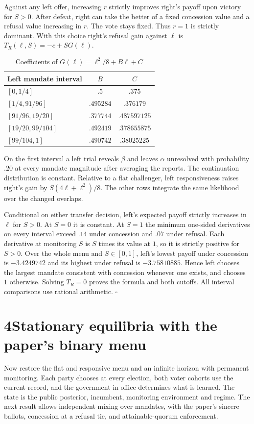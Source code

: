 \documentclass[11pt,letterpaper]{article}
\begin{document}
Against any left offer, increasing $r$ strictly improves right's payoff upon victory for $S>0$. After defeat, right can take the better of a fixed concession value and a refusal value increasing in $r$. The vote stays fixed. Thus $r=1$ is strictly dominant. With this choice right's refusal gain against $\ell$ is $T_R(\ell,S)=-c+SG(\ell)$.

\begin{table}[h]\centering\small
\caption{Coefficients of $G(\ell)=\ell^2/8+B\ell+C$}\label{tab:g}
\begin{tabular}{@{}lcc@{}}
\toprule
Left mandate interval & $B$ & $C$\\ \midrule
$[0,1/4]$ & $.5$ & $.375$\\
$[1/4,91/96]$ & $.495284$ & $.376179$\\
$[91/96,19/20]$ & $.377744$ & $.487597125$\\
$[19/20,99/104]$ & $.492419$ & $.378655875$\\
$[99/104,1]$ & $.490742$ & $.38025225$\\ \bottomrule
\end{tabular}
\end{table}
On the first interval a left trial reveals $\beta$ and leaves $\alpha$ unresolved with probability $.20$ at every mandate magnitude after averaging the reports. The continuation distribution is constant. Relative to a flat challenger, left responsiveness raises right's gain by $S(4\ell+\ell^2)/8$. The other rows integrate the same likelihood over the changed overlaps.

Conditional on either transfer decision, left's expected payoff strictly increases in $\ell$ for $S>0$. At $S=0$ it is constant. At $S=1$ the minimum one-sided derivatives on every interval exceed $.14$ under concession and $.07$ under refusal. Each derivative at monitoring $S$ is $S$ times its value at $1$, so it is strictly positive for $S>0$. Over the whole menu and $S\in[0,1]$, left's lowest payoff under concession is $-3.4249742$ and its highest under refusal is $-3.75810885$. Hence left chooses the largest mandate consistent with concession whenever one exists, and chooses $1$ otherwise. Solving $T_R=0$ proves the formula and both cutoffs. All interval comparisons use rational arithmetic. \hfill$\square$

\newpage
\section*{4\quad Stationary equilibria with the paper's binary menu}
Now restore the flat and responsive menu and an infinite horizon with permanent monitoring. Each party chooses at every election, both voter cohorts use the current record, and the government in office determines what is learned. The state is the public posterior, incumbent, monitoring environment and regime. The next result allows independent mixing over mandates, with the paper's sincere ballots, concession at a refusal tie, and attainable-quorum enforcement.
\end{document}
